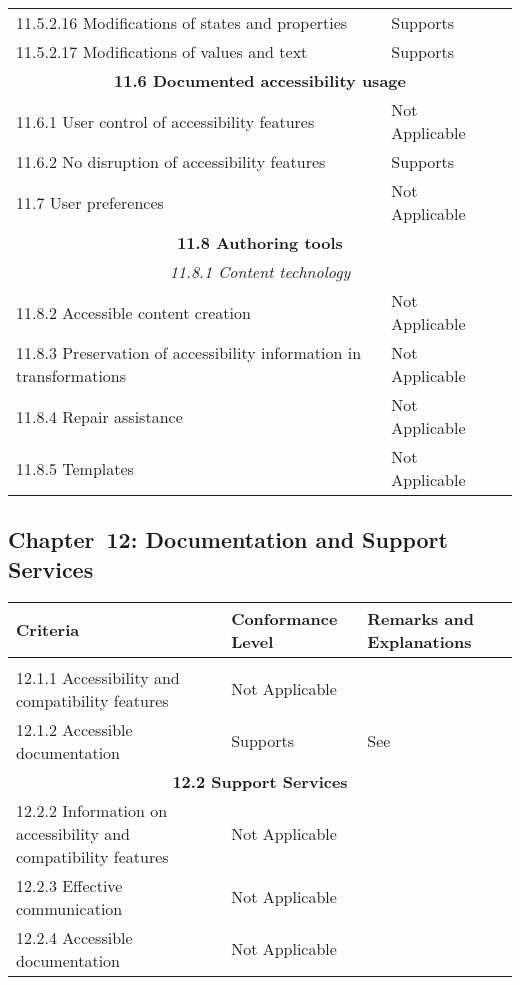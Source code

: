 \documentclass{report}
\begin{document}
\begin{longtable}{p{}<{\RaggedRight}p{}<{\RaggedRight}p{}<{\RaggedRight}}
  11.5.2.16 Modifications of states and properties & Supports\\
  11.5.2.17 Modifications of values and text & Supports\\
  \multicolumn{3}{c}{\bfseries 11.6 Documented accessibility usage}\\*
  11.6.1 User control of accessibility features & Not Applicable\\
  11.6.2 No disruption of accessibility features & Supports\\
  11.7 User preferences & Not Applicable\\
  \multicolumn{3}{c}{\bfseries 11.8 Authoring tools}\\*
  \multicolumn{3}{c}{\itshape 11.8.1 Content technology}\\*
  11.8.2 Accessible content creation & Not Applicable\\
  11.8.3 Preservation of accessibility information in transformations
           & Not Applicable\\
  11.8.4 Repair assistance & Not Applicable\\
  11.8.5 Templates & Not Applicable\\
\end{longtable}

\subsection{Chapter~12: Documentation and Support Services}
\label{sec:EN301-12}

\begin{longtable}{p{}<{\RaggedRight}p{}<{\RaggedRight}p{}<{\RaggedRight}}
  \toprule
  Criteria & Conformance Level & Remarks and Explanations \\
  \midrule
  \endhead
  \bottomrule
  \endfoot
  \multicolumn{3}{c}{\bfseries 12.1 Product documentation}\\*
  12.1.1 Accessibility and compatibility features & Not Applicable\\
  12.1.2 Accessible documentation & Supports & See \nameref{sec:wcag}\\
  \multicolumn{3}{c}{\bfseries 12.2 Support Services}\\*
  12.2.2 Information on accessibility and compatibility features & Not Applicable\\
  12.2.3 Effective communication & Not Applicable\\
  12.2.4 Accessible documentation & Not Applicable\\
\end{longtable}
\end{document}
